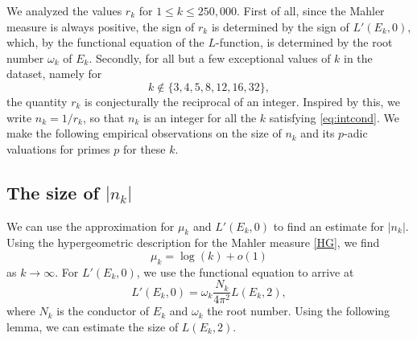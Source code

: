 \documentclass[12pt]{amsart}%
\newcommand{\1}{\mathds{1}}
\theoremstyle{definition}
\numberwithin{equation}{section}
\numberwithin{table}{section}
\numberwithin{figure}{section}
\begin{document}
We analyzed the values $r_k$ for $1 \le k \le 250{,}000$. First of all, since the Mahler measure is always positive, the sign of $r_k$ is determined by the sign of $L'(E_k,0)$, which, by the functional equation of the $L$-function, is determined by the root number $\omega_k$ of $E_k$. Secondly, for all  but a few exceptional values of $k$ in the dataset,%
namely for
\begin{equation}\label{eq:intcond}
k \notin \{3,4,5,8,12,16,32\},
\end{equation}
the quantity $r_k$ is conjecturally the reciprocal of an integer.
Inspired by this, we write $n_k =  1/r_k$, so that $n_k$ is an integer for all the $k$ satisfying \eqref{eq:intcond}. We make the following empirical observations on the size of $n_k$ and its $p$-adic valuations for primes $p$ for these $k$.


\subsection{The size of $|n_k|$}
We can use the approximation for $\mu_k$ and $L'(E_k,0)$ to find an estimate for $|n_k|$.
Using the hypergeometric description for the Mahler measure \eqref{HG}, we find
\begin{equation}
\label{mmk}
\mu_k = \log(k) + o(1)
\end{equation}
as $k \to \infty$. For $L'(E_k,0)$, we use the functional equation to arrive at
\begin{equation}
\label{lvk}
L'(E_k,0) = \omega_k \frac{N_k}{4 \pi^2 }L(E_k,2),
\end{equation}
where $N_k$ is the conductor of $E_k$ and $\omega_k$ the root number. Using the following lemma, we can estimate the size of $L(E_k,2)$.
\end{document}
